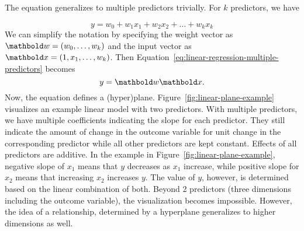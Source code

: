 The equation generalizes to multiple predictors trivially.
For $k$ predictors, we have

\begin{marginfigure}
  \caption{\label{fig:linear-plane-example}%
    Visualization of a linear  of a linear equation with two predictors:
    $y = 1 - 2x_{2} + x_{1}$.
  }
\end{marginfigure}
\begin{equation}\label{eq:linear-regression-multiple-predictors}
  y = w_{0} + w_{1} x_{1} + w_{2} x_{2} + \ldots + w_{k} x_{k}
\end{equation}
We can simplify the notation by specifying the weight vector as
$\vect{w} = (w_{0}, \ldots, w_{k})$
and the input vector as $\vect{x} = (1, x_{1}, \ldots, w_{k})$.%
Then Equation~\ref{eq:linear-regression-multiple-predictors} becomes
\begin{equation*}
  y = \vect{w} \vect{x} .
\end{equation*}
Now, the equation defines a (hyper)plane.
Figure~\ref{fig:linear-plane-example} visualizes an example
linear model with two predictors.
With multiple predictors,
we have multiple coefficients indicating the slope for each predictor.
They still indicate the amount of change in the outcome variable
for unit change in the corresponding predictor
while all other predictors are kept constant.
Effects of all predictors are additive.
In the example in Figure~\ref{fig:linear-plane-example},
negative slope of $x_{1}$ means that $y$ decreases as $x_{1}$ increase,
while positive slope for $x_{2}$ means that increasing $x_{2}$ increases $y$.
The value of $y$, however, is determined
based on the linear combination of both.
Beyond 2 predictors (three dimensions including the outcome variable),
the visualization becomes impossible.
However, the idea of a relationship, determined by a hyperplane
generalizes to higher dimensions as well.

